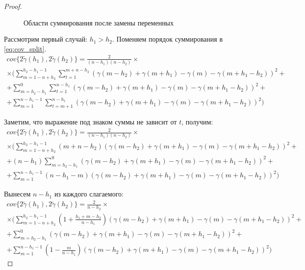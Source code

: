 \begin{proof}
\begin{figure}[H]
	\caption{Области суммирования после замены переменных}
	\label{fig:label}
\end{figure}

Рассмотрим первый случай: $h_1 > h_2$. Поменяем порядок суммирования в \eqref{eq:cov_split}.
\begin{multline*}
	cov\{ 2 \tilde{\gamma}(h_1), 2 \tilde{\gamma}(h_2) \} = \frac{2}{(n - h_1) (n - h_2)} \times \\
	\times (\sum_{m = 1 - n + h_2}^{h_2 - h_1 - 1}\sum_{t = 1}^{m + n - h_2}(\gamma(m - h_2) + \gamma(m + h_1) - \gamma(m) - \gamma(m + h_1 - h_2))^2 + \\
	+ \sum_{m = h_2 - h_1}^{0}\sum_{t = 1}^{n - h_1}(\gamma(m - h_2) + \gamma(m + h_1) - \gamma(m) - \gamma(m + h_1 - h_2))^2 + \\
	+ \sum_{m = 1}^{n - h_1 - 1}\sum_{t = m + 1}^{n - h_1}(\gamma(m - h_2) + \gamma(m + h_1) - \gamma(m) - \gamma(m + h_1 - h_2))^2)
\end{multline*}

Заметим, что выражение под знаком суммы не зависит от $t$, получим:
\begin{multline*}
	cov\{ 2 \tilde{\gamma}(h_1), 2 \tilde{\gamma}(h_2) \} = \frac{2}{(n - h_1) (n - h_2)} \times \\
	\times (\sum_{m = 1 - n + h_2}^{h_2 - h_1 - 1}(m + n - h_2)(\gamma(m - h_2) + \gamma(m + h_1) - \gamma(m) - \gamma(m + h_1 - h_2))^2 + \\
	+ (n - h_1)\sum_{m = h_2 - h_1}^{0}(\gamma(m - h_2) + \gamma(m + h_1) - \gamma(m) - \gamma(m + h_1 - h_2))^2 + \\
	+ \sum_{m = 1}^{n - h_1 - 1}(n - h_1 - m)(\gamma(m - h_2) + \gamma(m + h_1) - \gamma(m) - \gamma(m + h_1 - h_2))^2)
\end{multline*}

Вынесем $ n - h_1 $ из каждого слагаемого:
\begin{multline*}
	cov\{ 2 \tilde{\gamma}(h_1), 2 \tilde{\gamma}(h_2) \} = \frac{2}{n - h_2} \times \\
	\times (\sum_{m = 1 - n + h_2}^{h_2 - h_1 - 1} (1 + \frac{h_1 + m - h_2}{n - h_1})(\gamma(m - h_2) + \gamma(m + h_1) - \gamma(m) - \gamma(m + h_1 - h_2))^2 + \\
	+ \sum_{m = h_2 - h_1}^{0}(\gamma(m - h_2) + \gamma(m + h_1) - \gamma(m) - \gamma(m + h_1 - h_2))^2 + \\
	+ \sum_{m = 1}^{n - h_1 - 1}(1 - \frac{m}{n - h_1})(\gamma(m - h_2) + \gamma(m + h_1) - \gamma(m) - \gamma(m + h_1 - h_2))^2)
\end{multline*}


\end{proof}
